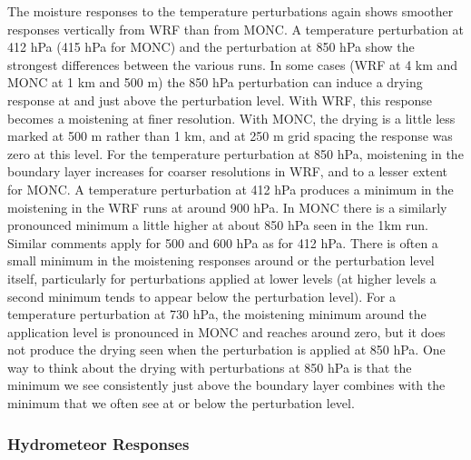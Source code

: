 \documentclass[draft]{agujournal2019}
\begin{document}
The moisture responses to the temperature perturbations again shows smoother
responses vertically from WRF than from MONC. A temperature perturbation at 412
hPa (415 hPa for MONC) and the perturbation at 850 hPa show the strongest
differences between the various runs. In some cases (WRF at 4 km and MONC at 1
km and 500 m) the 850 hPa perturbation can induce a drying response at and just
above the perturbation level. With WRF, this response becomes a moistening at
finer resolution. With MONC, the drying is a little less marked at 500 m rather
than 1 km, and at 250 m grid spacing the response was zero at this level. For
the temperature perturbation at 850 hPa, moistening in the boundary layer
increases for coarser resolutions in WRF, and to a lesser extent for MONC. A
temperature perturbation at 412 hPa produces a minimum in the moistening in the
WRF runs at around 900 hPa. In MONC there is a similarly pronounced minimum a
little higher at about 850 hPa seen in the 1km run. Similar comments apply for
500 and 600 hPa as for 412 hPa. There is often a small minimum in the moistening
responses around or the perturbation level itself, particularly for
perturbations applied at lower levels (at higher levels a second minimum tends
to appear below the perturbation level). For a temperature perturbation at 730
hPa, the moistening minimum around the application level is pronounced in MONC
and reaches around zero, but it does not produce the drying seen when the
perturbation is applied at 850 hPa. One way to think about the drying with
perturbations at 850 hPa is that the minimum we see consistently just above the
boundary layer combines with the minimum that we often see at or below the
perturbation level.

\subsubsection{Hydrometeor Responses}
\end{document}
